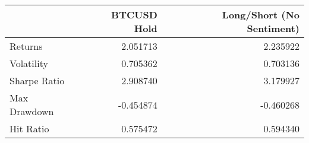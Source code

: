 \begin{tabular}{lrr}
\toprule
{} &  BTCUSD Hold &  Long/Short (No Sentiment) \\
\midrule
Returns      &     2.051713 &                   2.235922 \\
Volatility   &     0.705362 &                   0.703136 \\
Sharpe Ratio &     2.908740 &                   3.179927 \\
Max Drawdown &    -0.454874 &                  -0.460268 \\
Hit Ratio    &     0.575472 &                   0.594340 \\
\bottomrule
\end{tabular}
